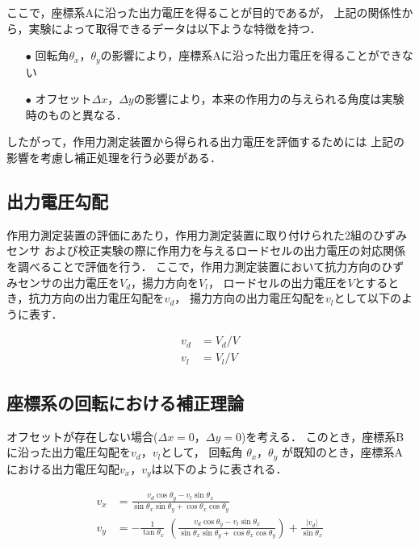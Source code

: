\documentclass[twocolumn,a4j]{jsarticle}
\begin{document}
ここで，座標系Aに沿った出力電圧を得ることが目的であるが，
上記の関係性から，実験によって取得できるデータは以下ような特徴を持つ．

\begin{itemize}
    \item [$\bullet$] 回転角$\theta_x$，$\theta_y$の影響により，座標系Aに沿った出力電圧を得ることができない
    \item [$\bullet$] オフセット$\Delta x$，$\Delta y$の影響により，本来の作用力の与えられる角度は実験時のものと異なる．
\end{itemize}

したがって，作用力測定装置から得られる出力電圧を評価するためには
上記の影響を考慮し補正処理を行う必要がある．\\

\subsection{出力電圧勾配}

作用力測定装置の評価にあたり，作用力測定装置に取り付けられた2組のひずみセンサ
および校正実験の際に作用力を与えるロードセルの出力電圧の対応関係を調べることで評価を行う．
ここで，作用力測定装置において抗力方向のひずみセンサの出力電圧を$V_d$，揚力方向を$V_l$，
ロードセルの出力電圧を$V$とするとき，抗力方向の出力電圧勾配を$v_d$，
揚力方向の出力電圧勾配を$v_l$として以下のように表す．

\begin{align*}
    v_d &= V_d / V \\
    v_l &= V_l / V
\end{align*}

\newpage

\subsection{座標系の回転における補正理論}
オフセットが存在しない場合($\Delta x = 0$，$\Delta y = 0$)を考える．
このとき，座標系Bに沿った出力電圧勾配を$v_d$，$v_l$として，
回転角 $\theta_x$，$\theta_y$ が既知のとき，座標系Aにおける出力電圧勾配$v_x$，$v_y$は以下のように表される．

\begin{align*}
    v_x & = \frac{v_d \cos \theta_y - v_l \sin \theta_x}{\sin \theta_x \sin \theta_y + \cos \theta_x \cos \theta_y}                                                                                   \\
    v_y & = - \frac{1}{\tan \theta_x} \; \left(\frac{v_d \cos \theta_y - v_l \sin \theta_x}{\sin \theta_x \sin \theta_y + \cos \theta_x \cos \theta_y}\right) + \frac{|v_d|}{\sin \theta_x} \\
\end{align*}
\end{document}
